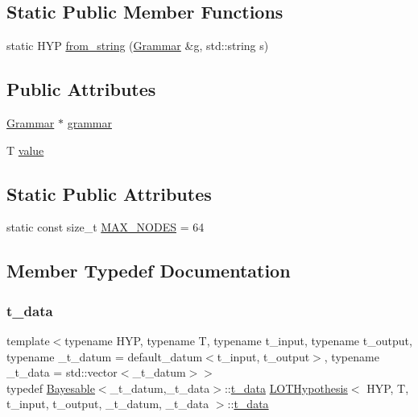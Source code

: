 \subsection*{Static Public Member Functions}
\begin{DoxyCompactItemize}
\item 
static H\+YP \hyperlink{class_l_o_t_hypothesis_a684d3208f52e10c61418dc0707142a30}{from\+\_\+string} (\hyperlink{class_grammar}{Grammar} \&g, std\+::string s)
\end{DoxyCompactItemize}
\subsection*{Public Attributes}
\begin{DoxyCompactItemize}
\item 
\hyperlink{class_grammar}{Grammar} $\ast$ \hyperlink{class_l_o_t_hypothesis_aa7cf638b5d680794e33aa5eb4bd36b09}{grammar}
\item 
T \hyperlink{class_l_o_t_hypothesis_aff7455a900ffb91790e5235119676a80}{value}
\end{DoxyCompactItemize}
\subsection*{Static Public Attributes}
\begin{DoxyCompactItemize}
\item 
static const size\+\_\+t \hyperlink{class_l_o_t_hypothesis_ab262eb592887136a986f5b2649397eca}{M\+A\+X\+\_\+\+N\+O\+D\+ES} = 64
\end{DoxyCompactItemize}


\subsection{Member Typedef Documentation}
\mbox{\label{class_l_o_t_hypothesis_a3a7b2c5fb3e2b5d70fa80b485b0b98f5}} 
\subsubsection{\texorpdfstring{t\+\_\+data}{t\_data}}
{\footnotesize\ttfamily template$<$typename H\+YP, typename T, typename t\+\_\+input, typename t\+\_\+output, typename \+\_\+t\+\_\+datum = default\+\_\+datum$<$t\+\_\+input, t\+\_\+output$>$, typename \+\_\+t\+\_\+data = std\+::vector$<$\+\_\+t\+\_\+datum$>$$>$ \\
typedef \hyperlink{class_bayesable}{Bayesable}$<$\+\_\+t\+\_\+datum,\+\_\+t\+\_\+data$>$\+::\hyperlink{class_l_o_t_hypothesis_a3a7b2c5fb3e2b5d70fa80b485b0b98f5}{t\+\_\+data} \hyperlink{class_l_o_t_hypothesis}{L\+O\+T\+Hypothesis}$<$ H\+YP, T, t\+\_\+input, t\+\_\+output, \+\_\+t\+\_\+datum, \+\_\+t\+\_\+data $>$\+::\hyperlink{class_l_o_t_hypothesis_a3a7b2c5fb3e2b5d70fa80b485b0b98f5}{t\+\_\+data}}

